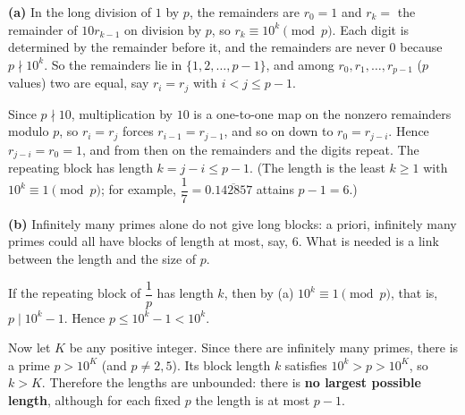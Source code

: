 \textbf{(a)} In the long division of $1$ by $p$, the remainders are $r_0=1$ and $r_{k}=$ the remainder of $10r_{k-1}$ on division by $p$, so $r_k\equiv10^k\pmod p$. Each digit is determined by the remainder before it, and the remainders are never $0$ because $p\nmid10^k$. So the remainders lie in $\{1,2,\dots,p-1\}$, and among $r_0,r_1,\dots,r_{p-1}$ ($p$ values) two are equal, say $r_i=r_j$ with $i<j\le p-1$.

Since $p\nmid10$, multiplication by $10$ is a one-to-one map on the nonzero remainders modulo $p$, so $r_i=r_j$ forces $r_{i-1}=r_{j-1}$, and so on down to $r_0=r_{j-i}$. Hence $r_{j-i}=r_0=1$, and from then on the remainders and the digits repeat. The repeating block has length $k=j-i\le p-1$. (The length is the least $k\ge1$ with $10^k\equiv1\pmod p$; for example, $\dfrac{1}{7}=0.\overline{142857}$ attains $p-1=6$.)

\textbf{(b)} Infinitely many primes alone do not give long blocks: a priori, infinitely many primes could all have blocks of length at most, say, $6$. What is needed is a link between the length and the size of $p$.

If the repeating block of $\dfrac{1}{p}$ has length $k$, then by (a) $10^k\equiv1\pmod p$, that is, $p\mid10^k-1$. Hence $p\le10^k-1<10^k$.

Now let $K$ be any positive integer. Since there are infinitely many primes, there is a prime $p>10^K$ (and $p\ne2,5$). Its block length $k$ satisfies $10^k>p>10^K$, so $k>K$. Therefore the lengths are unbounded: there is \textbf{no largest possible length}, although for each fixed $p$ the length is at most $p-1$.
